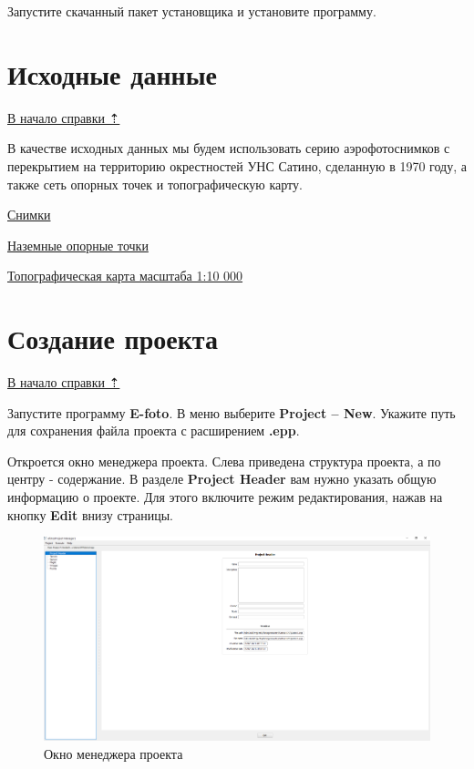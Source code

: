 \documentclass[
  12pt,
]{book}
\begin{document}
Запустите скачанный пакет установщика и установите программу.

\hypertarget{stereo-initial}{%
\section{Исходные данные}\label{stereo-initial}}

\protect\hyperlink{stereo}{В начало справки ⇡}

В качестве исходных данных мы будем использовать серию аэрофотоснимков с перекрытием на территорию окрестностей УНС Сатино, сделанную в 1970 году, а также сеть опорных точек и топографическую карту.

\href{https://yadi.sk/d/x7V_hMkPuviJVw}{Снимки}

\href{https://yadi.sk/d/gEQC2jcCFJGifA}{Наземные опорные точки}

\href{https://yadi.sk/i/XM7Z30SZcvy6IA}{Топографическая карта масштаба 1:10 000}

\hypertarget{stereo-create_project}{%
\section{Создание проекта}\label{stereo-create_project}}

\protect\hyperlink{stereo}{В начало справки ⇡}

Запустите программу \textbf{E-foto}. В меню выберите \textbf{Project -- New}. Укажите путь для сохранения файла проекта с расширением \textbf{.epp}.

Откроется окно менеджера проекта. Слева приведена структура проекта, а по центру - содержание. В разделе \textbf{Project Header} вам нужно указать общую информацию о проекте. Для этого включите режим редактирования, нажав на кнопку \textbf{Edit} внизу страницы.

\begin{figure}
\centering
\includegraphics{images/Ref13/Project_Manager.png}
\caption{Окно менеджера проекта}
\end{figure}
\end{document}
